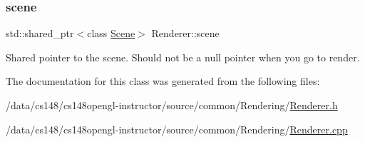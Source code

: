 \subsubsection{\texorpdfstring{scene}{scene}}
{\footnotesize\ttfamily std\+::shared\+\_\+ptr$<$class \hyperlink{class_scene}{Scene}$>$ Renderer\+::scene\hspace{0.3cm}{\ttfamily [protected]}}



Shared pointer to the scene. Should not be a null pointer when you go to render. 



The documentation for this class was generated from the following files\+:\begin{DoxyCompactItemize}
\item 
/data/cs148/cs148opengl-\/instructor/source/common/\+Rendering/\hyperlink{_renderer_8h}{Renderer.\+h}\item 
/data/cs148/cs148opengl-\/instructor/source/common/\+Rendering/\hyperlink{_renderer_8cpp}{Renderer.\+cpp}\end{DoxyCompactItemize}
